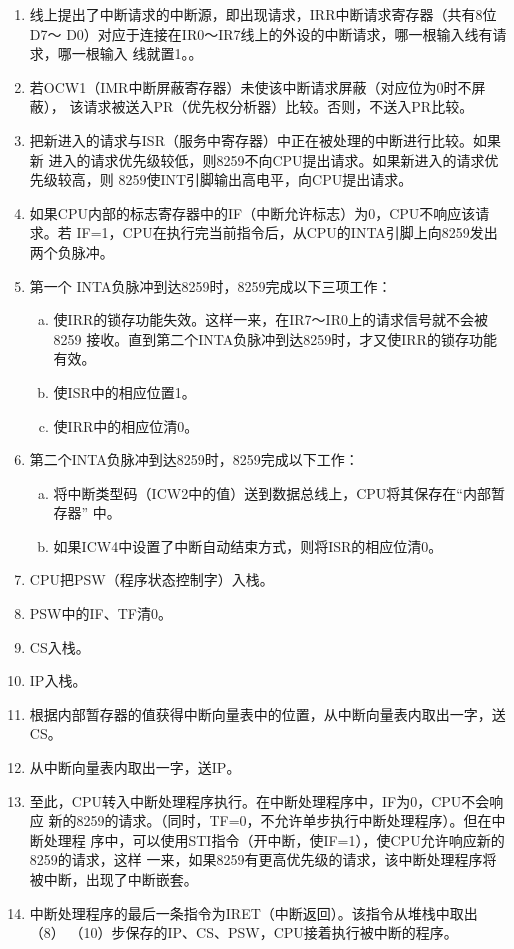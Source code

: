 \begin{enumerate}[(1)]
	\item 线上提出了中断请求的中断源，即出现请求，IRR中断请求寄存器（共有8位D7～
	D0）对应于连接在IR0～IR7线上的外设的中断请求，哪一根输入线有请求，哪一根输入
	线就置1。。
	\item 若OCW1（IMR中断屏蔽寄存器）未使该中断请求屏蔽（对应位为0时不屏蔽），
	该请求被送入PR（优先权分析器）比较。否则，不送入PR比较。	
	\item 把新进入的请求与ISR（服务中寄存器）中正在被处理的中断进行比较。如果新
	进入的请求优先级较低，则8259不向CPU提出请求。如果新进入的请求优先级较高，则
	8259使INT引脚输出高电平，向CPU提出请求。
	\item 如果CPU内部的标志寄存器中的IF（中断允许标志）为0，CPU不响应该请求。若
	IF=1，CPU在执行完当前指令后，从CPU的INTA引脚上向8259发出两个负脉冲。
	\item 第一个 INTA负脉冲到达8259时，8259完成以下三项工作：
	\begin{enumerate}[a.]
		\item 使IRR的锁存功能失效。这样一来，在IR7～IR0上的请求信号就不会被8259
		接收。直到第二个INTA负脉冲到达8259时，才又使IRR的锁存功能有效。 
		\item 使ISR中的相应位置1。
		\item 使IRR中的相应位清0。
	\end{enumerate}
	\item 第二个INTA负脉冲到达8259时，8259完成以下工作：
	\begin{enumerate}[a.]
		\item 将中断类型码（ICW2中的值）送到数据总线上，CPU将其保存在“内部暂存器”
		中。
		\item 如果ICW4中设置了中断自动结束方式，则将ISR的相应位清0。
	\end{enumerate}
	\item CPU把PSW（程序状态控制字）入栈。
	\item PSW中的IF、TF清0。
	\item CS入栈。
	\item IP入栈。
	\item 根据内部暂存器的值获得中断向量表中的位置，从中断向量表内取出一字，送
	CS。
	\item 从中断向量表内取出一字，送IP。
	\item 至此，CPU转入中断处理程序执行。在中断处理程序中，IF为0，CPU不会响应
	新的8259的请求。（同时，TF=0，不允许单步执行中断处理程序）。但在中断处理程
	序中，可以使用STI指令（开中断，使IF=1），使CPU允许响应新的8259的请求，这样
	一来，如果8259有更高优先级的请求，该中断处理程序将被中断，出现了中断嵌套。
	\item 中断处理程序的最后一条指令为IRET（中断返回）。该指令从堆栈中取出（8）
	\pozhehao （10）步保存的IP、CS、PSW，CPU接着执行被中断的程序。
\end{enumerate}

